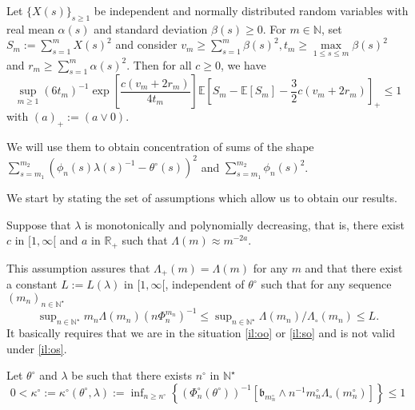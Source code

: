 \begin{lm}\label{BAYES_GAUSS_CONTRACT_HIERARCHICAL_LM_ESP}\label{lmA.1.2}
Let $\{X(s)\}_{s \geq 1}$ be independent and normally distributed random variables with real mean $\alpha(s)$ and standard deviation $\beta(s) \geq 0$. For $m \in \mathds{N}$, set $S_{m} := \sum \limits_{s = 1}^{m} X(s)^{2}$ and consider $v_{m} \geq \sum\limits_{s = 1}^{m} \beta(s)^{2}, t_{m} \geq \max \limits_{1 \leq s \leq m} \beta(s)^{2}$ and $r_{m} \geq \sum\limits_{s = 1}^{m} \alpha(s)^{2}$.
Then for all $c \geq 0$, we have
\[\sup\limits_{m \geq 1}(6 t_{m})^{-1} \exp\left[\frac{c (v_{m} + 2 r_{m})}{4 t_{m}}\right] \mathds{E}\left[S_{m} - \mathds{E}[S_{m}] - \frac{3}{2} c (v_{m} + 2 r_{m})\right]_{+} \leq 1\]
with $(a)_{+} := (a \vee 0).$
\reEnd
\end{lm}
We will use them to obtain concentration of sums of the shape $\sum\nolimits_{s = m_{1}}^{m_{2}}(\phi_{n}(s) \lambda(s)^{-1} - \theta^{\circ}(s))^{2}$ and $\sum\nolimits_{s = m_{1}}^{m_{2}} \phi_{n}(s)^{2}$.

\medskip

We start by stating the set of assumptions which allow us to obtain our results.

\begin{as}\label{AS_BAYES_GAUSS_CONTRACT_HIERARCHICAL_LAMBDA}
Suppose that $\lambda$ is monotonically and polynomially decreasing, that is, there exist $c$ in $[1, \infty[$ and $a$ in $\mathds{R}_{+}$ such that $\Lambda(m) \approx m^{-2a}$.
\end{as}

This assumption assures that $\Lambda_{+}(m) = \Lambda(m)$ for any $m$ and that there exist a constant $L := L(\lambda)$ in $[1, \infty[$, independent of $\theta^{\circ}$ such that for any sequence $\left(m_{n}\right)_{n \in \mathds{N}^{\star}}$ 
\[\sup\nolimits_{n \in \mathds{N}^{\star}} m_{n} \Lambda(m_{n})(n \Phi_{n}^{m_{n}})^{-1} \leq \sup\nolimits_{n \in \mathds{N}^{\star}} \Lambda(m_{n})/\Lambda_{\circ}(m_{n}) \leq L.\]
It basically requires that we are in the situation \ref{il:oo} or \ref{il:so} and is not valid under \ref{il:os}.

\begin{as}\label{AS_BAYES_GAUSS_CONTRACT_HIERARCHICAL_ORACLE}
Let $\theta^{\circ}$ and $\lambda$ be such that there exists $n^{\circ}$ in $\mathds{N}^{\star}$
\[0 < \kappa^{\circ} := \kappa^{\circ}(\theta^{\circ}, \lambda) := \inf\nolimits_{n \geq n^{\circ}} \left\{\left(\Phi_{n}^{\circ}(\theta^{\circ})\right)^{-1} \left[\mathfrak{b}_{m_{n}^{\circ}} \wedge n^{-1} m_{n}^{\circ} \Lambda_{\circ}(m_{n}^{\circ})\right]\right\} \leq 1\]
\end{as}

